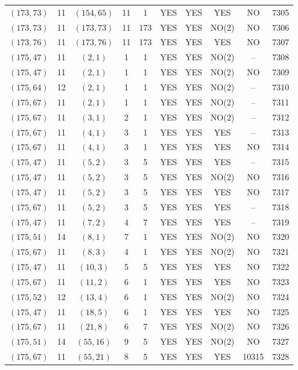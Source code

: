 \begin{longtable}{|c|c|c|c|c|c|c|c|c|c|}
$(173, 73)$ & 11 & $(154, 65)$ & 11 & 1 & YES & YES & YES & NO & 7305\\
$(173, 73)$ & 11 & $(173, 73)$ & 11 & 173 & YES & YES & NO(2) & NO & 7306\\
$(173, 76)$ & 11 & $(173, 76)$ & 11 & 173 & YES & YES & YES & NO & 7307\\
$(175, 47)$ & 11 & $(2, 1)$ & 1 & 1 & YES & YES & NO(2) & -- & 7308\\
$(175, 47)$ & 11 & $(2, 1)$ & 1 & 1 & YES & YES & NO(2) & NO & 7309\\
$(175, 64)$ & 12 & $(2, 1)$ & 1 & 1 & YES & YES & NO(2) & -- & 7310\\
$(175, 67)$ & 11 & $(2, 1)$ & 1 & 1 & YES & YES & NO(2) & -- & 7311\\
$(175, 67)$ & 11 & $(3, 1)$ & 2 & 1 & YES & YES & NO(2) & -- & 7312\\
$(175, 67)$ & 11 & $(4, 1)$ & 3 & 1 & YES & YES & YES & -- & 7313\\
$(175, 67)$ & 11 & $(4, 1)$ & 3 & 1 & YES & YES & YES & NO & 7314\\
$(175, 47)$ & 11 & $(5, 2)$ & 3 & 5 & YES & YES & YES & -- & 7315\\
$(175, 47)$ & 11 & $(5, 2)$ & 3 & 5 & YES & YES & NO(2) & NO & 7316\\
$(175, 47)$ & 11 & $(5, 2)$ & 3 & 5 & YES & YES & YES & NO & 7317\\
$(175, 67)$ & 11 & $(5, 2)$ & 3 & 5 & YES & YES & YES & -- & 7318\\
$(175, 47)$ & 11 & $(7, 2)$ & 4 & 7 & YES & YES & YES & -- & 7319\\
$(175, 51)$ & 14 & $(8, 1)$ & 7 & 1 & YES & YES & NO(2) & NO & 7320\\
$(175, 67)$ & 11 & $(8, 3)$ & 4 & 1 & YES & YES & NO(2) & NO & 7321\\
$(175, 47)$ & 11 & $(10, 3)$ & 5 & 5 & YES & YES & YES & NO & 7322\\
$(175, 67)$ & 11 & $(11, 2)$ & 6 & 1 & YES & YES & YES & NO & 7323\\
$(175, 52)$ & 12 & $(13, 4)$ & 6 & 1 & YES & YES & NO(2) & NO & 7324\\
$(175, 47)$ & 11 & $(18, 5)$ & 6 & 1 & YES & YES & YES & NO & 7325\\
$(175, 67)$ & 11 & $(21, 8)$ & 6 & 7 & YES & YES & NO(2) & NO & 7326\\
$(175, 51)$ & 14 & $(55, 16)$ & 9 & 5 & YES & YES & NO(2) & NO & 7327\\
$(175, 67)$ & 11 & $(55, 21)$ & 8 & 5 & YES & YES & YES & 10315 & 7328\\

\end{longtable}
